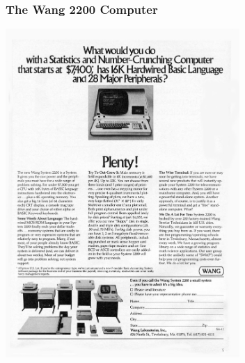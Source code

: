 \begin{frame}
    \frametitle{The Wang 2200 Computer}
    \begin{center}
        \includegraphics[width=3.5in]{Photos/Wang_System_2200_Computer_1974.jpg}        
    \end{center}  
\end{frame}
